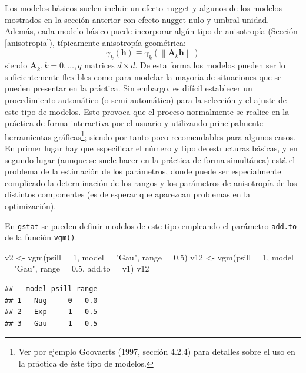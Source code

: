 \documentclass[
  spanish,
]{book}
\newenvironment{Shaded}{\begin{snugshade}}{\end{snugshade}}
\newcommand{\AttributeTok}[1]{\textcolor[rgb]{0.77,0.63,0.00}{#1}}
\newcommand{\DecValTok}[1]{\textcolor[rgb]{0.00,0.00,0.81}{#1}}
\newcommand{\FloatTok}[1]{\textcolor[rgb]{0.00,0.00,0.81}{#1}}
\newcommand{\FunctionTok}[1]{\textcolor[rgb]{0.00,0.00,0.00}{#1}}
\newcommand{\NormalTok}[1]{#1}
\newcommand{\OtherTok}[1]{\textcolor[rgb]{0.56,0.35,0.01}{#1}}
\newcommand{\StringTok}[1]{\textcolor[rgb]{0.31,0.60,0.02}{#1}}
\theoremstyle{break}
\theoremstyle{definition}
\theoremstyle{definition}
\theoremstyle{definition}
\theoremstyle{definition}
\theoremstyle{remark}
\begin{document}
Los modelos básicos suelen incluir un efecto nugget y algunos de los modelos mostrados en la sección anterior con efecto nugget nulo y umbral unidad.
Además, cada modelo básico puede incorporar algún tipo de anisotropía (Sección \ref{anisotropia}), típicamente anisotropía geométrica:
\[\gamma_{k}(\mathbf{h})\equiv \gamma_{k}^{} \left( \left\| \mathbf{A}_{k} \mathbf{h}\right\| \right)\]
siendo \(\mathbf{A}_{k} ,k=0,\ldots,q\) matrices \(d\times d\).
De esta forma los modelos pueden ser lo suficientemente flexibles como para modelar la mayoría de situaciones que se pueden presentar en la práctica.
Sin embargo, es difícil establecer un procedimiento automático (o semi-automático) para la selección y el ajuste de este tipo de modelos.
Esto provoca que el proceso normalmente se realice en la práctica de forma interactiva por el usuario y utilizando principalmente herramientas gráficas\footnote{Ver por ejemplo Goovaerts (1997, sección 4.2.4) para detalles sobre el uso en la práctica de éste tipo de modelos.}; siendo por tanto poco recomendables para algunos casos.
En primer lugar hay que especificar el número y tipo de estructuras básicas, y en segundo lugar (aunque se suele hacer en la práctica de forma simultánea) está el problema de la estimación de los parámetros, donde puede ser especialmente complicado la determinación de los rangos y los parámetros de anisotropía de los distintos componentes (es de esperar que aparezcan problemas en la optimización).

En \texttt{gstat} se pueden definir modelos de este tipo empleando el parámetro \texttt{add.to} de la función \texttt{vgm()}.

\begin{Shaded}
\begin{Highlighting}[]
\NormalTok{v2 }\OtherTok{\textless{}{-}} \FunctionTok{vgm}\NormalTok{(}\AttributeTok{psill =} \DecValTok{1}\NormalTok{, }\AttributeTok{model =} \StringTok{"Gau"}\NormalTok{, }\AttributeTok{range =} \FloatTok{0.5}\NormalTok{)}
\NormalTok{v12 }\OtherTok{\textless{}{-}} \FunctionTok{vgm}\NormalTok{(}\AttributeTok{psill =} \DecValTok{1}\NormalTok{, }\AttributeTok{model =} \StringTok{"Gau"}\NormalTok{, }\AttributeTok{range =} \FloatTok{0.5}\NormalTok{, }\AttributeTok{add.to =}\NormalTok{ v1)}
\NormalTok{v12}
\end{Highlighting}
\end{Shaded}

\begin{verbatim}
##   model psill range
## 1   Nug     0   0.0
## 2   Exp     1   0.5
## 3   Gau     1   0.5
\end{verbatim}
\end{document}
